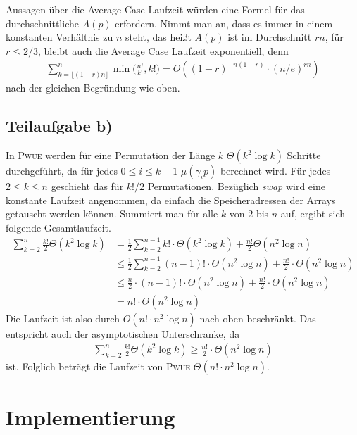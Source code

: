 \documentclass[a4paper, 10pt, ngerman]{article}
\begin{document}
Aussagen über die Average Case-Laufzeit würden eine Formel für das durchschnittliche $A(p)$ erfordern. Nimmt man an, dass es immer in einem konstanten Verhältnis zu $n$ steht, das heißt $A(p)$ ist im Durchschnitt $rn$, für $r \le 2/3$, bleibt auch die Average Case Laufzeit exponentiell, denn
\begin{align*}
    \sum_{k = \lfloor (1 - r)n \rfloor}^n \min \bigg ( \frac {n!}{k!}, k! \bigg ) 
    = O((1 - r)^{-n(1 - r)} \cdot (n/e)^{rn}) 
\end{align*}
nach der gleichen Begründung wie oben.

\subsection{Teilaufgabe b)}

In \textsc{Pwue} werden für eine Permutation der Länge $k$ $\Theta(k^2 \log k)$ Schritte durchgeführt, da für jedes $0 \le i \le k - 1$ $\mu(\gamma_i p)$ berechnet wird. Für jedes $2 \le k \le n$ geschieht das für $k! / 2$ Permutationen. Bezüglich \emph{swap} wird eine konstante Laufzeit angenommen, da einfach die Speicheradressen der Arrays getauscht werden können. Summiert man für alle $k$ von $2$ bis $n$ auf, ergibt sich folgende Gesamtlaufzeit.
\begin{align*}
    \sum_{k = 2}^{n} \frac {k!} 2 \Theta(k^2 \log k)
     & = \frac 1 2 \sum_{k = 2}^{n - 1} k! \cdot \Theta(k^2 \log k) + \frac {n!} 2 \Theta(n^2 \log n) \\
     & \le \frac 1 2 \sum_{k = 2}^{n - 1} (n - 1)! \cdot \Theta(n^2 \log n) + \frac {n!} 2 \cdot \Theta(n^2 \log n) \\
     & \le \frac n 2 \cdot (n - 1)! \cdot \Theta(n^2 \log n) + \frac{n!} 2 \cdot \Theta(n^2 \log n)                 \\
     & = n! \cdot \Theta(n^2 \log n)
\end{align*}
Die Laufzeit ist also durch $O(n! \cdot n^2 \log n)$ nach oben beschränkt. Das entspricht auch der asymptotischen Unterschranke, da
\begin{align*}
    \sum_{k = 2}^{n} \frac {k!} 2 \Theta(k^2 \log k)
    \ge \frac {n!} 2 \cdot \Theta(n^2 \log n)
\end{align*}
ist. Folglich beträgt die Laufzeit von \textsc{Pwue} $\Theta(n! \cdot n^2 \log n)$.

\section{Implementierung}
\end{document}
